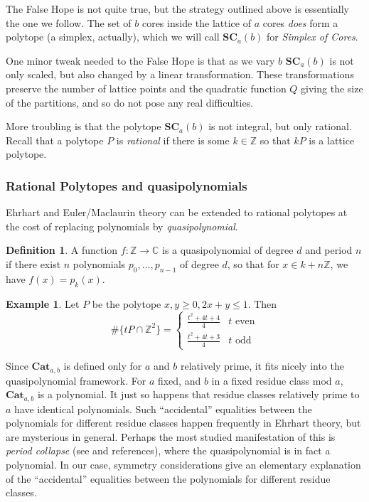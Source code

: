 \documentclass{amsart}[12pt]
\theoremstyle{definition}
\newtheorem{example}[dummy]{Example}
\newtheorem{definition}[dummy]{Definition}
\newcommand{\Z}{\mathbb{Z}}
\newcommand{\C}{\mathbb{C}}
\newcommand{\SC}{\mathbf{SC}}
\newcommand{\Cat}{\mathbf{Cat}}
\begin{document}
The False Hope is not quite true, but the strategy outlined above is essentially the one we follow.  The set of $b$ cores inside the lattice of $a$ cores \emph{does} form a polytope (a simplex, actually), which we will call $\SC_a(b)$ for \emph{Simplex of Cores}.  

One minor tweak needed to the False Hope is that as we vary $b$ $\SC_a(b)$ is not only scaled, but also changed by a linear transformation.  These transformations preserve the number of lattice points and the quadratic function $Q$ giving the size of the partitions, and so do not pose any real difficulties.

More troubling is that the polytope $\SC_{a}(b)$ is not integral, but only rational.  Recall that a polytope $P$ is \emph{rational} if there is some $k\in\Z$ so that $kP$ is a lattice polytope.   


\subsubsection{Rational Polytopes and quasipolynomials}
Ehrhart and Euler/Maclaurin theory can be extended to rational polytopes at the cost of replacing polynomials by \emph{quasipolynomial}.  

\begin{definition}
A function $f:\Z\to\C$ is a quasipolynomial of degree $d$ and period $n$ if there exist $n$ polynomials $p_0,\dots, p_{n-1}$ of degree $d$, so that for $x\in k+n\Z$, we have $f(x)=p_k(x)$.
\end{definition}

\begin{example} Let $P$ be the polytope $x, y\geq 0, 2x+y\leq 1$.  Then
$$\#\{tP\cap \Z^2\}=\left\{\begin{array}{rl} \frac{t^2+4t+4}{4} & \text{$t$ even} \\ 
\frac{t^2+4t+3}{4} & \text{$t$ odd}\end{array}\right.$$ 
\end{example}

Since $\Cat_{a,b}$ is defined only for $a$ and $b$ relatively prime, it fits nicely into the quasipolynomial framework.  For $a$ fixed, and $b$ in a fixed residue class mod $a$, $\Cat_{a,b}$ is a polynomial.  It just so happens that residue classes relatively prime to $a$ have identical polynomials.  Such ``accidental'' equalities between the polynomials for different residue classes happen frequently in Ehrhart theory, but are mysterious in general.  Perhaps the most studied manifestation of this is \emph{period collapse} (see \cite{Haase} and references), where the quasipolynomial is in fact a polynomial.  In our case, symmetry considerations give an elementary explanation of the ``accidental'' equalities between the polynomials for different residue classes.
\end{document}
